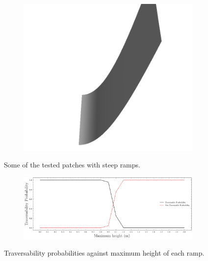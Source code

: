 \documentclass[../document.tex]{subfiles}
\begin{document}
\begin{figure}[htbp]
\begin{subfigure}[b]{0.24\textwidth}
    \includegraphics[width=\linewidth]{../img/5/custom_patches/ramp/all/19-3d.png}
    \end{subfigure}
    \caption{Some of the tested patches with steep ramps.}
    \label{fig: ramps}
    \end{figure}

\begin{figure}[htbp]
    \centering
\begin{subfigure}[b]{1\textwidth}
    \includegraphics[width=\linewidth]{../img/5/custom_patches/ramp/predictions.png}
    \end{subfigure}
    \caption{Traversability probabilities against maximum height of each ramp.}
    \label{fig: ramps-preds}
\end{figure}
\end{document}
